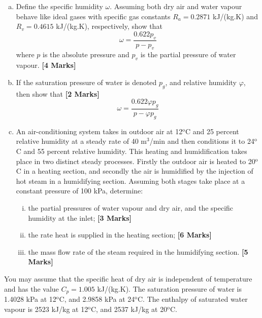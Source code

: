 \documentclass[calculator,steamtables]{exam}
\newcommand{\frc}{\displaystyle\frac}
\begin{document}
\begin{question}\vspace{-2\baselineskip}

\begin{enumerate}[(a)]
\item Define the specific humidity $\omega$. Assuming both dry air and water vapour behave like ideal gases with specific gas constants $R_{a}=0.2871$ kJ/(kg.K) and $R_{v}=0.4615$ kJ/(kg.K), respectively, show that
\begin{displaymath}
\omega = \frc{0.622 p_{v}}{p-p_{v}}
\end{displaymath}
where $p$ is the absolute pressure and $p_{v}$ is the partial pressure of water vapour. {\bf [4 Marks]}
\medskip

\item If the saturation pressure of water is denoted $p_{g}$, and relative humidity $\varphi$, then show that {\bf [2 Marks]}
\begin{displaymath}
\omega = \frc{0.622 \varphi p_{g}}{p-\varphi p_{g}}
\end{displaymath}
\medskip

\item An air-conditioning system takes in outdoor air at 12$^{\text{o}}$C and 25 percent relative humidity at a steady rate of 40 m$^{3}$/min and then conditions it to 24$^{\text{o}}$C and 55 percent relative humidity. This heating and humidification takes place in two distinct steady processes. Firstly the outdoor air is heated to 20$^{\text{o}}$C in a heating section, and secondly the air is humidified by the injection of hot steam in a humidifying section. Assuming both stages take place at a constant pressure of 100 kPa, determine:
\begin{enumerate}[(i)]
\item the partial pressures of water vapour and dry air, and the specific humidity at the inlet; {\bf [3 Marks]}  
\item the rate heat is supplied in the heating section;  {\bf [6 Marks]}
\item the mass flow rate of the steam required in the humidifying section. {\bf [5 Marks]}
\end{enumerate}
\medskip
\end{enumerate}
You may assume that the specific heat of dry air is independent of temperature and has the value $C_{p}=1.005$ kJ/(kg.K). The saturation pressure of water is 1.4028 kPa at 12$^{\text{o}}$C, and 2.9858 kPa at 24$^{\text{o}}$C. The enthalpy of saturated water vapour is 2523 kJ/kg at 12$^{\text{o}}$C, and 2537 kJ/kg at 20$^{\text{o}}$C.

\end{question}



\vfill

\paperend
\end{document}
